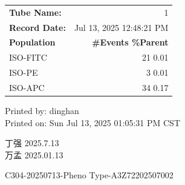 \documentclass[UTF8,10pt,a4paper,fontset=fandol]{ctexart}
\newcommand{\fieldvalue}[1]{#1}
\newcommand{\handwritten}[1]{#1}
\begin{document}
\begin{center}
\small
\begin{tabular}{lr}
\textbf{Tube Name:} &
\fieldvalue{1}
\\
\textbf{Record Date:} &
\fieldvalue{Jul 13, 2025 12:48:21 PM}
\\[1mm]
\textbf{Population} & \textbf{\#Events \qquad \%Parent}\\
ISO-FITC &
\fieldvalue{21}
\quad
\fieldvalue{0.01}
\\
ISO-PE &
\fieldvalue{3}
\quad
\fieldvalue{0.01}
\\
ISO-APC &
\fieldvalue{34}
\quad
\fieldvalue{0.17}
\end{tabular}
\end{center}

\vfill

\begin{flushright}
\scriptsize
Printed by:%
\fieldvalue{dinghan}\\
Printed on:%
\fieldvalue{Sun Jul 13, 2025 01:05:31 PM CST}
\end{flushright}

\begin{flushright}
\handwritten{丁强}\quad
\handwritten{2025.7.13}\\[2mm]
\handwritten{万孟}\quad
\handwritten{2025.01.13}
\end{flushright}

\newpage

\begin{center}
C304-20250713-Pheno Type-A3Z72202507002
\end{center}
\end{document}
